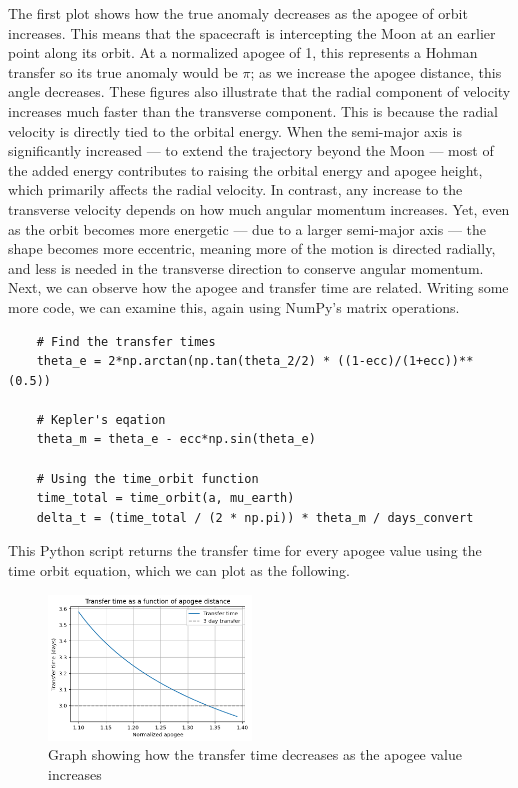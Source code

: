 \documentclass[12pt,twocolumn]{article}  %
\begin{document}
The first plot shows how the true anomaly decreases as the apogee of orbit increases. This means that the spacecraft
is intercepting the Moon at an earlier point along its orbit. At a normalized apogee of 1, this represents
a Hohman transfer so its true anomaly would be $\pi$; as we increase the apogee distance, this angle decreases.
\vspace{0.75cm}
\newline
\indent These figures also illustrate that the radial component of velocity increases
much faster than the transverse component. This is because the radial velocity is directly tied to the orbital 
energy. When the semi-major axis is significantly increased — to extend the trajectory beyond the Moon — most 
of the added energy contributes to raising the orbital energy and apogee height, which primarily affects 
the radial velocity. In contrast, any increase to the transverse velocity depends on how much angular momentum increases.
Yet, even as the orbit becomes more energetic — due to a larger semi-major axis — the shape becomes more eccentric, 
meaning more of the motion is directed radially, and less is needed in the transverse direction to conserve angular momentum.
\vspace{0.75cm}
\newline
\indent Next, we can observe how the apogee and transfer time are related.
Writing some more code, we can examine this, again using NumPy's matrix operations.
\begin{lstlisting}
    # Find the transfer times
    theta_e = 2*np.arctan(np.tan(theta_2/2) * ((1-ecc)/(1+ecc))**(0.5))

    # Kepler's eqation
    theta_m = theta_e - ecc*np.sin(theta_e)

    # Using the time_orbit function
    time_total = time_orbit(a, mu_earth)
    delta_t = (time_total / (2 * np.pi)) * theta_m / days_convert
\end{lstlisting}

This Python script returns the transfer time for every 
apogee value using the time orbit equation, which we can plot as the following.

\begin{figure}[H]
    \centering
    \includegraphics[width=0.48\textwidth]{Images/222-time.png}
    \caption{Graph showing how the transfer time decreases as the apogee value increases}
\end{figure}
\end{document}
